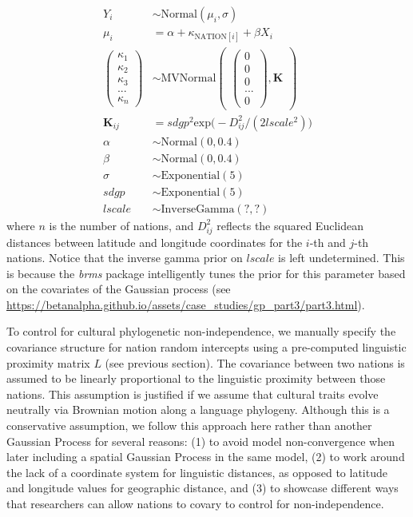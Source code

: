\documentclass[
  man,floatsintext]{apa6}
\begin{document}
\[
\begin{aligned}
Y_{i} &\sim \text{Normal}(\mu_{i},\sigma) \\
\mu_{i} &= \alpha + \kappa_{\text{NATION}[i]} + \beta X_{i} \\
\begin{pmatrix}
\kappa_{1} \\ \kappa_{2} \\ \kappa_{3} \\ ... \\ \kappa_{n}
\end{pmatrix} &\sim \text{MVNormal}
\begin{pmatrix}
\begin{pmatrix}
0 \\ 0 \\ 0 \\ ... \\ 0
\end{pmatrix},\textbf{K}
\end{pmatrix}\\
\textbf{K}_{ij} &= sdgp^2 \text{exp} \big (-D_{ij}^2 / (2 lscale^2) \big )\\
\alpha &\sim \text{Normal}(0, 0.4) \\
\beta &\sim \text{Normal}(0, 0.4) \\
\sigma &\sim \text{Exponential}(5) \\
sdgp &\sim \text{Exponential}(5) \\
lscale &\sim \text{InverseGamma}(?,?)
\end{aligned}
\]
where \(n\) is the number of nations, and \(D^2_{ij}\) reflects the squared Euclidean distances between latitude and longitude coordinates for the \(i\)-th and \(j\)-th nations. Notice that the inverse gamma prior on \(lscale\) is left undetermined. This is because the \emph{brms} package intelligently tunes the prior for this parameter based on the covariates of the Gaussian process (see \url{https://betanalpha.github.io/assets/case_studies/gp_part3/part3.html}).

\newpage

To control for cultural phylogenetic non-independence, we manually specify the covariance structure for nation random intercepts using a pre-computed linguistic proximity matrix \(L\) (see previous section). The covariance between two nations is assumed to be linearly proportional to the linguistic proximity between those nations. This assumption is justified if we assume that cultural traits evolve neutrally via Brownian motion along a language phylogeny. Although this is a conservative assumption, we follow this approach here rather than another Gaussian Process for several reasons: (1) to avoid model non-convergence when later including a spatial Gaussian Process in the same model, (2) to work around the lack of a coordinate system for linguistic distances, as opposed to latitude and longitude values for geographic distance, and (3) to showcase different ways that researchers can allow nations to covary to control for non-independence.
\end{document}
